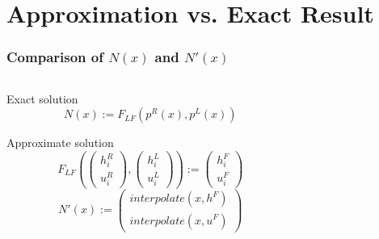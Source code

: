 \documentclass{beamer}
\begin{document}
\section{Approximation vs. Exact Result}
\label{sec:comparing-approx-and-exact-result}

\begin{frame}
  \frametitle{Comparison of $N(x)$ and $N'(x)$}
  \begin{columns}
    \begin{column}{.5\textwidth}
      \begin{block}{Exact solution}
        \vspace{-.3cm} %
        \begin{equation*}
          N(x) := F_{LF}(p^R(x),p^L(x))
        \end{equation*}
      \end{block}
      \begin{block}{Approximate solution}
        \vspace{-.5cm} %
        \begin{equation*}
          F_{LF}\left(
            \begin{pmatrix}
              h_i^R \\ u_i^R
            \end{pmatrix},
            \begin{pmatrix}
              h_i^L \\ u_i^L
            \end{pmatrix}
          \right) :=
          \begin{pmatrix}
            h_i^F \\ u_i^F
          \end{pmatrix} %
        \end{equation*}
        \vspace{-.1cm} %
        \begin{equation*}
          N'(x) :=
          \begin{pmatrix}
            interpolate(x,h^F) \\ interpolate(x,u^F)
          \end{pmatrix}
        \end{equation*}        
      \end{block}
    \end{column}
    \begin{column}{.4\textwidth}
      \begin{center}
        \begin{tikzpicture}[scale=0.7]

\end{tikzpicture}
\end{center}
\end{column}
\end{columns}
\end{frame}
\end{document}
